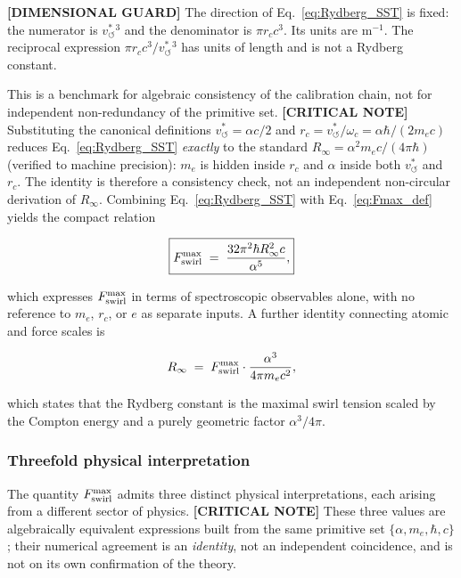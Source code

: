 \documentclass[11pt]{article}
\theoremstyle{definition}
\theoremstyle{plain}
\theoremstyle{remark}
\newcommand{\rc}{{r_c}}
\newcommand{\vchar}{v_{\!\boldsymbol{\circlearrowleft}}^{\ast}}
\begin{document}
        \textbf{[DIMENSIONAL GUARD]} The direction of Eq.~\eqref{eq:Rydberg_SST} is fixed: the numerator is $\vchar{}^3$ and the denominator is $\pi\rc c^3$. Its units are $\mathrm{m^{-1}}$. The reciprocal expression $\pi\rc c^3/\vchar{}^3$ has units of length and is not a Rydberg constant.

        This is a benchmark for algebraic consistency of the calibration chain, not for independent non-redundancy of the primitive set. \textbf{[CRITICAL NOTE]} Substituting the canonical definitions $\vchar=\alpha c/2$ and $\rc=\vchar/\omega_c=\alpha\hbar/(2m_ec)$ reduces Eq.~\eqref{eq:Rydberg_SST} \emph{exactly} to the standard $R_\infty=\alpha^2 m_e c/(4\pi\hbar)$ (verified to machine precision): $m_e$ is hidden inside $\rc$ and $\alpha$ inside both $\vchar$ and $\rc$. The identity is therefore a consistency check, not an independent non-circular derivation of $R_\infty$. Combining Eq.~\eqref{eq:Rydberg_SST} with Eq.~\eqref{eq:Fmax_def} yields the compact relation

        \begin{align}
            \boxed{
            F_{\rm swirl}^{\max}
            \;=\; \frac{32\pi^2\hbar R_\infty^2 c}{\alpha^5},
            }
            \label{eq:Fmax_Rydberg}
        \end{align}

        which expresses $F_{\rm swirl}^{\max}$ in terms of spectroscopic observables alone, with no reference to $m_e$, $\rc$, or $e$ as separate inputs. A further identity connecting atomic and force scales is

        \begin{align}
            R_\infty \;=\; F_{\rm swirl}^{\max} \cdot \frac{\alpha^3}{4\pi m_e c^2},
            \label{eq:Rydberg_Fmax}
        \end{align}

        which states that the Rydberg constant is the maximal swirl tension scaled by the Compton energy and a purely geometric factor $\alpha^3/4\pi$.

        \subsubsection{Threefold physical interpretation}

        The quantity $F_{\rm swirl}^{\max}$ admits three distinct physical interpretations, each arising from a different sector of physics. \textbf{[CRITICAL NOTE]} These three values are algebraically equivalent expressions built from the same primitive set $\{\alpha,m_e,\hbar,c\}$; their numerical agreement is an \emph{identity}, not an independent coincidence, and is not on its own confirmation of the theory.
\end{document}
